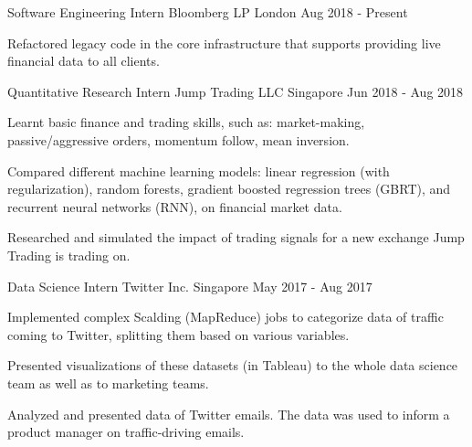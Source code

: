 

\begin{cventries}

  \cventry
  {Software Engineering Intern} %
  {Bloomberg LP} %
  {London} %
  {Aug 2018 - Present} %
  {
    \begin{cvitems} %
    \item {Refactored legacy code in the core infrastructure that supports providing live financial data to all clients.}
    \end{cvitems}
  }

  \cventry
  {Quantitative Research Intern} %
  {Jump Trading LLC} %
  {Singapore} %
  {Jun 2018 - Aug 2018} %
  {
    \begin{cvitems} %
    \item {Learnt basic finance and trading skills, such as: market-making, passive/aggressive orders, momentum follow, mean inversion.}
    \item {Compared different machine learning models: linear regression (with regularization), random forests, gradient boosted regression trees (GBRT), and recurrent neural networks (RNN), on financial market data.}
    \item {Researched and simulated the impact of trading signals for a new exchange Jump Trading is trading on.}
    \end{cvitems}
  }

  \cventry
  {Data Science Intern} %
  {Twitter Inc.} %
  {Singapore} %
  {May 2017 - Aug 2017} %
  {
    \begin{cvitems} %
    \item {Implemented complex Scalding (MapReduce) jobs to categorize data of traffic coming to Twitter, splitting them based on various variables.}
    \item {Presented visualizations of these datasets (in Tableau) to the whole data science team as well as to marketing teams.}
    \item {Analyzed and presented data of Twitter emails. The data was used to inform a product manager on traffic-driving emails.}
    \end{cvitems}
  }


\end{cventries}
